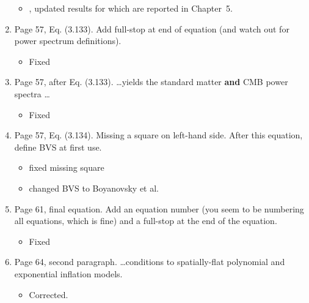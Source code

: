 \documentclass[11pt]{article}
\begin{document}
\begin{enumerate}
\begin{itemize}
    \item , updated results for which are reported in Chapter~5.
  \end{itemize}
\item Page 57, Eq. (3.133). Add full-stop at end of equation (and
  watch out for power spectrum definitions).
  \begin{itemize}
    \item Fixed
  \end{itemize}
\item Page 57, after Eq. (3.133). \ldots yields the standard matter
  \textbf{and} CMB power spectra \ldots
  \begin{itemize}
    \item Fixed
  \end{itemize}
\item Page 57, Eq. (3.134). Missing a square on left-hand side. After
  this equation, define BVS at first use.
  \begin{itemize}
    \item fixed missing square 
    \item changed BVS to Boyanovsky et al.
  \end{itemize}
\item Page 61, final equation. Add an equation number (you seem to be
  numbering all equations, which is fine) and a full-stop at the end
  of the equation.
  \begin{itemize}
    \item Fixed
  \end{itemize}
\item Page 64, second paragraph. \ldots conditions to spatially-flat
  polynomial and exponential inflation models.
  \begin{itemize}
    \item Corrected.
  \end{itemize}
\end{enumerate}
\end{document}
